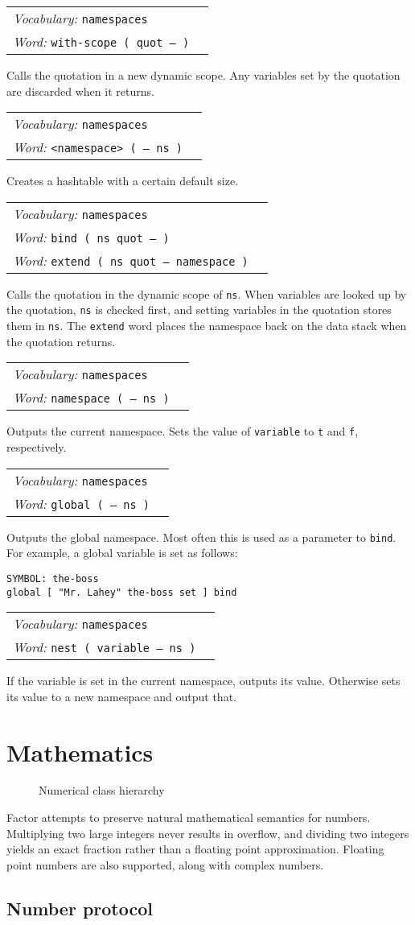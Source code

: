 \documentclass{book}
\newcommand{\vocabulary}[1]{\emph{Vocabulary:} \texttt{#1}&\\}
\newcommand{\ordinaryword}[2]{\index{\texttt{#1}}\emph{Word:} \texttt{#2}&\\}
\newcommand{\wordtable}[1]{


\begin{tabularx}{12cm}{lX}
\hline
#1
\hline
\end{tabularx}

}
\begin{document}
\wordtable{
\vocabulary{namespaces}
\ordinaryword{with-scope}{with-scope ( quot -- )}
}
Calls the quotation in a new dynamic scope. Any variables set by the quotation are discarded when it returns.
\wordtable{
\vocabulary{namespaces}
\ordinaryword{<namespace>}{<namespace> ( -- ns )}
}
Creates a hashtable with a certain default size.
\wordtable{
\vocabulary{namespaces}
\ordinaryword{bind}{bind ( ns quot -- )}
\ordinaryword{extend}{extend ( ns quot -- namespace )}
}
Calls the quotation in the dynamic scope of \texttt{ns}. When variables are looked up by the quotation, \texttt{ns} is checked first, and setting variables in the quotation stores them in \texttt{ns}. The \texttt{extend} word places the namespace back on the data stack when the quotation returns.
\wordtable{
\vocabulary{namespaces}
\ordinaryword{namespace}{namespace ( -- ns )}
}
Outputs the current namespace.
Sets the value of \texttt{variable} to \texttt{t} and \texttt{f}, respectively.
\wordtable{
\vocabulary{namespaces}
\ordinaryword{global}{global ( -- ns )}
}
Outputs the global namespace. Most often this is used as a parameter to \texttt{bind}. For example, a global variable is set as follows:
\begin{verbatim}
SYMBOL: the-boss
global [ "Mr. Lahey" the-boss set ] bind
\end{verbatim}
\wordtable{
\vocabulary{namespaces}
\ordinaryword{nest}{nest ( variable -- ns )}
}
If the variable is set in the current namespace, outputs its value. Otherwise sets its value to a new namespace and output that.

\section{Mathematics}

\numberglos

\begin{figure}
\caption{Numerical class hierarchy}
\begin{center}
\end{center}
\end{figure}

Factor attempts to preserve natural mathematical semantics for numbers. Multiplying two large integers never results in overflow, and dividing two integers yields an exact fraction rather than a floating point approximation. Floating point numbers are also supported, along with complex numbers.

\subsection{Number protocol}
\end{document}
